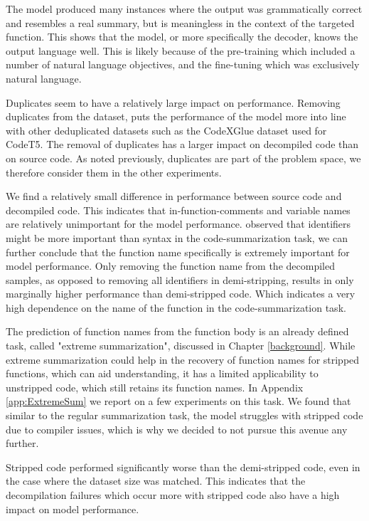 The model produced many instances where the output was grammatically correct and resembles a real summary, but is meaningless in the context of the targeted function. This shows that the model, or more specifically the decoder, knows the output language well. This is likely because of the pre-training which included a number of natural language objectives, and the fine-tuning which was exclusively natural language.

Duplicates seem to have a relatively large impact on performance. Removing duplicates from the dataset, puts the performance of the model more into line with other deduplicated datasets such as the CodeXGlue dataset used for CodeT5. The removal of duplicates has a larger impact on decompiled code than on source code. As noted previously, duplicates are part of the problem space, we therefore consider them in the other experiments.

We find a relatively small difference in performance between source code and decompiled code. This indicates that in-function-comments and variable names are relatively unimportant for the model performance. \citeauthor{PolyglotCodeBERT} observed that identifiers might be more important than syntax in the code-summarization task, we can further conclude that the function name specifically is extremely important for model performance. Only removing the function name from the decompiled samples, as opposed to removing all identifiers in demi-stripping, results in only marginally higher performance than demi-stripped code. Which indicates a very high dependence on the name of the function in the code-summarization task. 

The prediction of function names from the function body is an already defined task, called "extreme summarization", discussed in Chapter \ref{background}. While extreme summarization could help in the recovery of function names for stripped functions, which can aid understanding, it has a limited applicability to unstripped code, which still retains its function names. In Appendix \ref{app:ExtremeSum} we report on a few experiments on this task. We found that similar to the regular summarization task, the model struggles with stripped code due to compiler issues, which is why we decided to not pursue this avenue any further. 

Stripped code performed significantly worse than the demi-stripped code, even in the case where the dataset size was matched. This indicates that the decompilation failures which occur more with stripped code also have a high impact on model performance.

